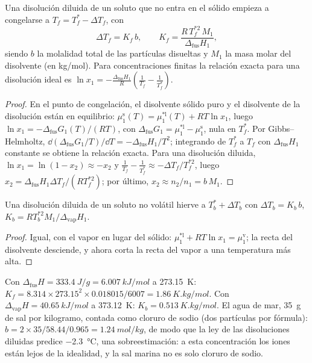 \begin{theorem}\label{thm:b2:chemical-potential:cryoscopy}
Una disolución diluida de un soluto que no entra en el sólido empieza a congelarse
a $T_f = T_f^* - \Delta T_f$, con
\[
  \Delta T_f = K_f\,b, \qquad K_f = \frac{R\,T_f^{*2}\,M_1}{\Delta_{\text{fus}}H_1} ,
\]
siendo $b$ la molalidad total de las partículas disueltas y $M_1$ la masa
molar del disolvente (en \unit{kg/mol}). Para concentraciones finitas la relación
exacta para una disolución ideal es $\ln x_1 = -\frac{\Delta_{\text{fus}}H_1}{R}
\left(\frac{1}{T_f} - \frac{1}{T_f^*}\right)$.
\end{theorem}

\begin{proof}
En el punto de congelación, el disolvente sólido puro y el disolvente de la disolución están en
equilibrio: $\mu_1^{\text{s}}(T) = \mu_1^{*\text{l}}(T) + RT\ln x_1$, luego
$\ln x_1 = -\Delta_{\text{fus}}G_1(T)/(RT)$, con $\Delta_{\text{fus}}G_1 =
\mu_1^{*\text{l}} - \mu_1^{\text{s}}$, nula en $T_f^*$. Por Gibbs--Helmholtz,
$\dd(\Delta_{\text{fus}}G_1/T)/\dd T = -\Delta_{\text{fus}}H_1/T^2$;
integrando de $T_f^*$ a $T_f$ con $\Delta_{\text{fus}}H_1$ constante se obtiene
la relación exacta. Para una disolución diluida, $\ln x_1 = \ln(1 - x_2) \approx
-x_2$ y $\frac1{T_f} - \frac1{T_f^*} \approx -\Delta T_f/T_f^{*2}$, luego
$x_2 = \Delta_{\text{fus}}H_1\Delta T_f/(RT_f^{*2})$; por último, $x_2 \approx
n_2/n_1 = b\,M_1$.
\end{proof}

\begin{proposition}\label{prop:b2:chemical-potential:ebullioscopy}
Una disolución diluida de un soluto no volátil hierve a $T_b^* + \Delta T_b$ con
$\Delta T_b = K_b\,b$, $K_b = RT_b^{*2}M_1/\Delta_{\text{vap}}H_1$.
\end{proposition}

\begin{proof}
Igual, con el vapor en lugar del sólido: $\mu_1^{*\text{l}} +
RT\ln x_1 = \mu_1^{\text{v}}$; la recta del disolvente desciende, y ahora corta la
recta del vapor a una temperatura más alta.
\end{proof}

\begin{example}[El agua]\label{ex:b2:chemical-potential:water-constants}
Con $\Delta_{\text{fus}}H = \qty{333.4}{J/g} = \qty{6.007}{kJ/mol}$ a
\qty{273.15}{K}: $K_f = 8.314 \times 273.15^2 \times 0.018015/6007 =
\qty{1.86}{K.kg/mol}$. Con $\Delta_{\text{vap}}H = \qty{40.65}{kJ/mol}$ a
\qty{373.12}{K}: $K_b = \qty{0.513}{K.kg/mol}$. El agua de mar, \qty{35}{g} de sal
por kilogramo, contada como cloruro de sodio (dos partículas por fórmula):
$b = 2 \times 35/58.44/0.965 = \qty{1.24}{mol/kg}$, de modo que la ley de las disoluciones diluidas
predice \qty{-2.3}{\celsius}, una sobreestimación: a esta concentración los
iones están lejos de la idealidad, y la sal marina no es solo cloruro de sodio.
\end{example}

